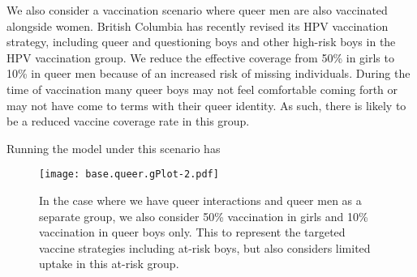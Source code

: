 \documentclass[12pt]{article}
\begin{document}
We also consider a vaccination scenario where queer men are also vaccinated alongside women.  British Columbia has recently revised its HPV vaccination strategy, including queer and questioning boys and other high-risk boys in the HPV vaccination group.  We reduce the effective coverage from 50\% in girls to 10\% in queer men because of an increased risk of missing individuals.  During the time of vaccination many queer boys may not feel comfortable coming forth or may not have come to terms with their queer identity.  As such, there is likely to be a reduced vaccine coverage rate in this group.

Running the model under this scenario has  

\begin{figure}[h!]
\begin{center}
\texttt{[image: base.queer.gPlot-2.pdf]}
\caption{In the case where we have queer interactions and queer men as a separate group, we also consider 50\% vaccination in girls and 10\% vaccination in queer boys only.  This to represent the targeted vaccine strategies including at-risk boys, but also considers limited uptake in this at-risk group.}
\end{center}
\end{figure}
%
%
%
\end{document}
